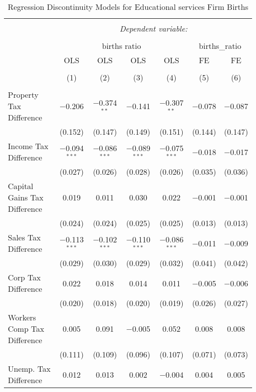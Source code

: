 
\begin{table}[!htbp] \centering 
  \caption{Regression Discontinuity Models for  Educational services Firm Births} 
  \label{61rd} 
\begin{tabular}{@{\extracolsep{5pt}}lcccccc} 
\\[-1.8ex]\hline 
\hline \\[-1.8ex] 
 & \multicolumn{6}{c}{\textit{Dependent variable:}} \\ 
\cline{2-7} 
\\[-1.8ex] & \multicolumn{4}{c}{births ratio} & \multicolumn{2}{c}{births\_ratio} \\ 
 & OLS & OLS & OLS & OLS & FE & FE \\ 
\\[-1.8ex] & (1) & (2) & (3) & (4) & (5) & (6)\\ 
\hline \\[-1.8ex] 
 Property Tax Difference & $-$0.206 & $-$0.374$^{**}$ & $-$0.141 & $-$0.307$^{**}$ & $-$0.078 & $-$0.087 \\ 
  & (0.152) & (0.147) & (0.149) & (0.151) & (0.144) & (0.147) \\ 
  Income Tax Difference & $-$0.094$^{***}$ & $-$0.086$^{***}$ & $-$0.089$^{***}$ & $-$0.075$^{***}$ & $-$0.018 & $-$0.017 \\ 
  & (0.027) & (0.026) & (0.028) & (0.026) & (0.035) & (0.036) \\ 
  Capital Gains Tax Difference & 0.019 & 0.011 & 0.030 & 0.022 & $-$0.001 & $-$0.001 \\ 
  & (0.024) & (0.024) & (0.025) & (0.025) & (0.013) & (0.013) \\ 
  Sales Tax Difference & $-$0.113$^{***}$ & $-$0.102$^{***}$ & $-$0.110$^{***}$ & $-$0.086$^{***}$ & $-$0.011 & $-$0.009 \\ 
  & (0.029) & (0.030) & (0.029) & (0.032) & (0.041) & (0.042) \\ 
  Corp Tax Difference & 0.022 & 0.018 & 0.014 & 0.011 & $-$0.005 & $-$0.006 \\ 
  & (0.020) & (0.018) & (0.020) & (0.019) & (0.026) & (0.027) \\ 
  Workers Comp Tax Difference & 0.005 & 0.091 & $-$0.005 & 0.052 & 0.008 & 0.008 \\ 
  & (0.111) & (0.109) & (0.096) & (0.107) & (0.071) & (0.073) \\ 
  Unemp. Tax Difference & 0.012 & 0.013 & 0.002 & $-$0.004 & 0.004 & 0.005 \\ 

\end{tabular}
\end{table}
